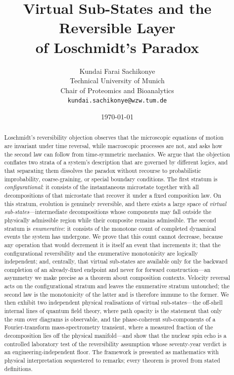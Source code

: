 \documentclass[11pt,a4paper]{article}
\title{\textbf{Virtual Sub-States and the Reversible Layer\\[2pt]
of Loschmidt's Paradox}}
\author{%
Kundai Farai Sachikonye\\
\small Technical University of Munich\\
\small Chair of Proteomics and Bioanalytics\\
\small \texttt{kundai.sachikonye@wzw.tum.de}}
\date{\today}
\theoremstyle{thmstyle}
\theoremstyle{definition}
\theoremstyle{remark}
\begin{document}
\maketitle

\begin{abstract}
\noindent
Loschmidt's reversibility objection observes that the microscopic
equations of motion are invariant under time reversal, while macroscopic
processes are not, and asks how the second law can follow from
time-symmetric mechanics. We argue that the objection conflates two
strata of a system's description that are governed by different logics,
and that separating them dissolves the paradox without recourse to
probabilistic improbability, coarse-graining, or special boundary
conditions. The first stratum is \emph{configurational}: it consists of
the instantaneous microstate together with all decompositions of that
microstate that recover it under a fixed composition law. On this
stratum, evolution is genuinely reversible, and there exists a large
space of \emph{virtual sub-states}---intermediate decompositions whose
components may fall outside the physically admissible region while their
composite remains admissible. The second stratum is \emph{enumerative}:
it consists of the monotone count of completed dynamical events the
system has undergone. We prove that this count cannot decrease, because
any operation that would decrement it is itself an event that increments
it; that the configurational reversibility and the enumerative
monotonicity are logically independent; and, centrally, that virtual
sub-states are available only for the backward completion of an
already-fixed endpoint and never for forward construction---an asymmetry
we make precise as a theorem about composition contexts. Velocity
reversal acts on the configurational stratum and leaves the enumerative
stratum untouched; the second law is the monotonicity of the latter and
is therefore immune to the former. We then exhibit two independent
physical realisations of virtual sub-states---the off-shell internal
lines of quantum field theory, where path opacity is the statement that
only the sum over diagrams is observable, and the phase-coherent
sub-components of a Fourier-transform mass-spectrometry transient, where
a measured fraction of the decomposition lies off the physical
manifold---and show that the nuclear spin echo is a controlled
laboratory test of the reversibility assumption whose seventy-year
verdict is an engineering-independent floor. The framework is presented
as mathematics with physical interpretation sequestered to remarks;
every theorem is proved from stated definitions.
\end{abstract}
\end{document}
